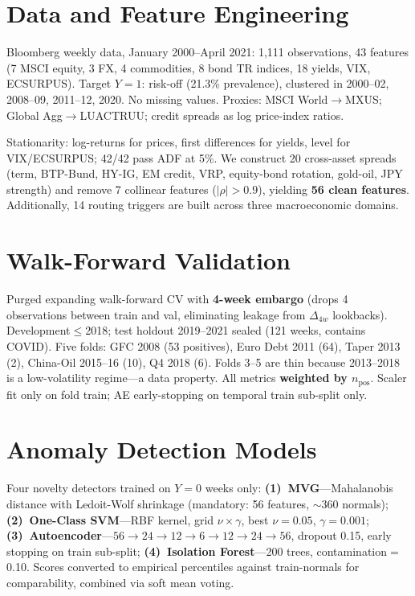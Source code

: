 \documentclass[10pt, a4paper]{article}
\begin{document}
\section{Data and Feature Engineering}

Bloomberg weekly data, January 2000--April 2021: 1,111 observations, 43 features (7 MSCI equity, 3 FX, 4 commodities, 8 bond TR indices, 18 yields, VIX, ECSURPUS). Target $Y{=}1$: risk-off (21.3\% prevalence), clustered in 2000--02, 2008--09, 2011--12, 2020. No missing values. Proxies: MSCI World$\to$MXUS; Global Agg$\to$LUACTRUU; credit spreads as log price-index ratios.

Stationarity: log-returns for prices, first differences for yields, level for VIX/ECSURPUS; 42/42 pass ADF at 5\%. We construct 20 cross-asset spreads (term, BTP-Bund, HY-IG, EM credit, VRP, equity-bond rotation, gold-oil, JPY strength) and remove 7 collinear features ($|\rho|{>}0.9$), yielding \textbf{56 clean features}. Additionally, 14 routing triggers are built across three macroeconomic domains.

\section{Walk-Forward Validation}

Purged expanding walk-forward CV with \textbf{4-week embargo} (drops 4 observations between train and val, eliminating leakage from $\Delta_{4w}$ lookbacks). Development$\leq$2018; test holdout 2019--2021 sealed (121 weeks, contains COVID). Five folds: GFC 2008 (53 positives), Euro Debt 2011 (64), Taper 2013 (2), China-Oil 2015--16 (10), Q4 2018 (6). Folds 3--5 are thin because 2013--2018 is a low-volatility regime---a data property. All metrics \textbf{weighted by $n_{\text{pos}}$}. Scaler fit only on fold train; AE early-stopping on temporal train sub-split only.

\section{Anomaly Detection Models}

Four novelty detectors trained on $Y{=}0$ weeks only: \textbf{(1)~MVG}---Mahalanobis distance with Ledoit-Wolf shrinkage (mandatory: 56 features, $\sim$360 normals); \textbf{(2)~One-Class SVM}---RBF kernel, grid $\nu{\times}\gamma$, best $\nu{=}0.05$, $\gamma{=}0.001$; \textbf{(3)~Autoencoder}---$56{\to}24{\to}12{\to}6{\to}12{\to}24{\to}56$, dropout 0.15, early stopping on train sub-split; \textbf{(4)~Isolation Forest}---200 trees, contamination$=$0.10. Scores converted to empirical percentiles against train-normals for comparability, combined via soft mean voting.
\end{document}

